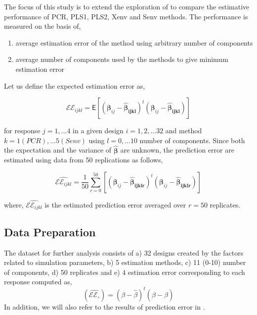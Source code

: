 \documentclass[12pt,3p,authoryear]{elsarticle}
\providecommand{\tightlist}{%
  \setlength{\itemsep}{0pt}\setlength{\parskip}{0pt}}
\begin{document}
The focus of this study is to extend the exploration of
\citet{rimal2019pred} to compare the estimative performance of PCR,
PLS1, PLS2, Xenv and Senv methods. The performance is measured on the
basis of,

\begin{enumerate}
\def\labelenumi{\alph{enumi})}
\tightlist
\item
  average estimation error of the method using arbitrary number of
  components
\item
  average number of components used by the methods to give minimum
  estimation error
\end{enumerate}

Let us define the expected estimation error as,

\begin{equation}
\mathcal{EE}_{ijkl} =
  \mathsf{E}{\left[\left(\boldsymbol{\beta}_{ij} -
  \boldsymbol{\hat{\beta}_{ijkl}}\right)^t
  \left(\boldsymbol{\beta}_{ij} - \boldsymbol{\hat{\beta}_{ijkl}}\right)\right]}
\label{eq:est-error}
\end{equation}

for response \(j = 1, \ldots 4\) in a given design \(i=1, 2, \ldots 32\)
and method \(k=1(PCR), \ldots 5(Senv)\) using \(l=0, \ldots 10\) number
of components. Since both the expectation and the variance of
\(\hat{\boldsymbol{\beta}}\) are unknown, the prediction error are
estimated using data from 50 replications as follows,

\begin{equation}
\widehat{\mathcal{EE}_{ijkl}} =
  \frac{1}{50}\sum_{r=0}^{50}{\left[\left(\boldsymbol{\beta}_{ij} -
  \boldsymbol{\hat{\beta}_{ijklr}}\right)^t
  \left(\boldsymbol{\beta}_{ij} - \boldsymbol{\hat{\beta}_{ijklr}}\right)\right]}
\label{eq:estimated-est-error}
\end{equation}

where, \(\widehat{\mathcal{EE}_{ijkl}}\) is the estimated prediction
error averaged over \(r=50\) replicates.

\subsection{Data Preparation}\label{data-preparation}

The dataset for further analysis consists of a) 32 designs created by
the factors related to simulation parameters, b) 5 estimation methods,
c) 11 (0-10) number of components, d) 50 replicates and e) 4 estimation
error corresponding to each response computed as,
\[\left(\widehat{\mathcal{EE}_\circ}\right) = \left(\beta - \hat{\beta}\right)^t\left(\beta - \hat{\beta}\right)\]
In addition, we will also refer to the results of prediction error in
\citet{rimal2019pred}.
\end{document}
